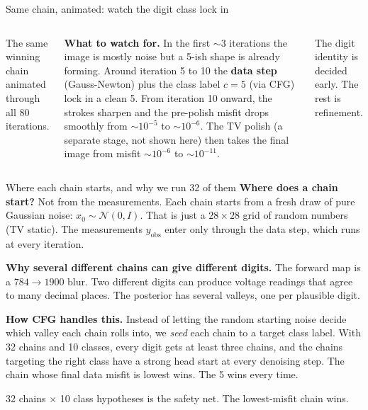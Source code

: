 \documentclass[aspectratio=169,10pt]{beamer}
\begin{document}
\begin{frame}{Same chain, animated: watch the digit class lock in}
\begin{columns}[T]
\centering
{}

\vspace{0.1em}
\footnotesize
The same winning chain animated through all 80 iterations.

\vspace{0.4em}
\textbf{What to watch for.} In the first $\sim 3$ iterations the image
is mostly noise but a 5-ish shape is already forming. Around iteration
5 to 10 the \textbf{data step} (Gauss-Newton) plus the class label
$c = 5$ (via CFG) lock in a clean 5. From iteration 10 onward, the
strokes sharpen and the pre-polish misfit drops smoothly from $\sim
10^{-5}$ to $\sim 10^{-6}$. The TV polish (a separate stage, not shown
here) then takes the final image from misfit $\sim 10^{-6}$ to
$\sim 10^{-11}$.

\vspace{0.4em}
\textcolor{osuorange}{The digit identity is decided early. The rest is refinement.}
\end{columns}
\end{frame}

\begin{frame}{Where each chain starts, and why we run 32 of them}
\footnotesize
\textbf{Where does a chain start?} Not from the measurements. Each
chain starts from a fresh draw of pure Gaussian noise: $x_0 \sim
\mathcal{N}(0, I)$. That is just a $28 \times 28$ grid of random
numbers (TV static). The measurements $y_{\text{obs}}$ enter only
through the data step, which runs at every iteration.

\vspace{0.5em}
\textbf{Why several different chains can give different digits.} The
forward map is a $784 \to 1900$ blur. Two different digits can produce
voltage readings that agree to many decimal places. The posterior has
several valleys, one per plausible digit.

\vspace{0.5em}
\textbf{How CFG handles this.} Instead of letting the random starting
noise decide which valley each chain rolls into, we \emph{seed} each
chain to a target class label. With 32 chains and 10 classes, every
digit gets at least three chains, and the chains targeting the right
class have a strong head start at every denoising step. The chain
whose final data misfit is lowest wins. The 5 wins every time.

\vspace{0.5em}
\centering
\textcolor{osuorange}{32 chains $\times$ 10 class hypotheses
is the safety net. The lowest-misfit chain wins.}
\end{frame}
\end{document}
